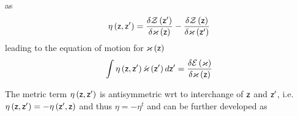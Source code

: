 as%
\begin{equation}
\eta \left( {\sf z,z}^{\prime }\right) =\frac{\delta {\cal Z}\left( {\sf z}%
^{\prime }\right) }{\delta {\cal \varkappa }\left( {\sf z}\right) }-\frac{%
\delta {\cal Z}\left( {\sf z}\right) }{\delta {\cal \varkappa }\left( {\sf z}%
^{\prime }\right) }  \label{metric}
\end{equation}%
leading to the equation of motion for ${\cal \varkappa }\left( {\sf z}%
\right) $ 
\begin{equation}
\int \eta \left( {\sf z,z}^{\prime }\right) {\cal \dot{\varkappa}}\left( 
{\sf z}^{\prime }\right) d{\sf z}^{\prime }=\frac{\delta {\cal E}\left( 
{\cal \varkappa }\right) }{\delta {\cal \varkappa }\left( {\sf z}\right) }
\label{EOM}
\end{equation}

The metric term $\eta \left( {\sf z,z}^{\prime }\right) $ is antisymmetric
wrt to interchange of ${\sf z}$ and ${\sf z}^{\prime }$, i.e. $\eta \left( 
{\sf z,z}^{\prime }\right) =-\eta \left( {\sf z}^{\prime }{\sf ,z}\right) $
and thus $\eta =-\eta ^{t}$ and can be further developed as 

